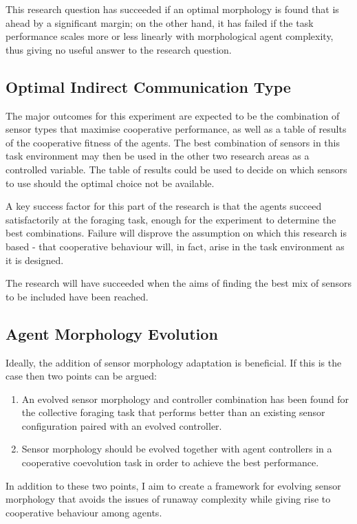 \documentclass[a4paper,12pt]{article}
\begin{document}
This research question has succeeded if an optimal morphology is found that is ahead by a significant margin; on the other hand, it has failed if the task performance scales more or less linearly with morphological agent complexity, thus giving no useful answer to the research question.

\subsection{Optimal Indirect Communication Type}
The major outcomes for this experiment are expected to be the combination of sensor types that maximise cooperative performance, as well as a table of results of the cooperative fitness of the agents. The best combination of sensors in this task environment may then be used in the other two research areas as a controlled variable. The table of results could be used to decide on which sensors to use should the optimal choice not be available.

A key success factor for this part of the research is that the agents succeed satisfactorily at the foraging task, enough for the experiment to determine the best combinations. Failure will disprove the assumption on which this research is based - that cooperative behaviour will, in fact, arise in the task environment as it is designed.

The research will have succeeded when the aims of finding the best mix of sensors to be included have been reached.

\subsection{Agent Morphology Evolution}
Ideally, the addition of sensor morphology adaptation is beneficial. If this is the case then two points can be argued:
\begin{enumerate}
\item An evolved sensor morphology and controller combination has been found for the collective foraging task that performs better than an existing sensor configuration paired with an evolved controller.
\item Sensor morphology should be evolved together with agent controllers in a cooperative coevolution task in order to achieve the best performance.
\end{enumerate}

In addition to these two points, I aim to create a framework for evolving sensor morphology that avoids the issues of runaway complexity while giving rise to cooperative behaviour among agents.
\end{document}
